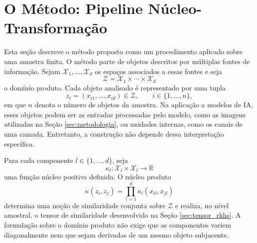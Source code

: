 \section{O Método: Pipeline Núcleo-Transformação}
\label{sec:kernel_pipeline}

Esta seção descreve o método proposto como um procedimento aplicado sobre uma amostra finita. O método parte de objetos descritos por múltiplas fontes de informação. Sejam $\mathcal{X}_1,\dots,\mathcal{X}_d$ os espaços associados a essas fontes e seja
\begin{equation}\label{eq:pipeline_product_domain}
    \mathcal{Z} = \mathcal{X}_1 \times \cdots \times \mathcal{X}_d
\end{equation}
o domínio produto. Cada objeto analisado é representado por uma tupla
\begin{equation}\label{eq:pipeline_observation}
    z_i = (x_{i1},\dots,x_{id}) \in \mathcal{Z}, \qquad i\in\{1,\dots,n\},
\end{equation}
em que $n$ denota o número de objetos da amostra. Na aplicação a modelos de IA, esses objetos podem ser as entradas processadas pelo modelo, como as imagens utilizadas na Seção \ref{sec:metodologia}, ou unidades internas, como os canais de uma camada. Entretanto, a construção não depende dessa interpretação específica.

Para cada componente $l\in\{1,\dots,d\}$, seja
\begin{equation*}
    \kappa_l:
    \mathcal{X}_l\times\mathcal{X}_l
    \longrightarrow
    \mathbb{R}
\end{equation*}
uma função núcleo positiva definida. O núcleo produto
\begin{equation}\label{eq:pipeline_product_kernel}
    \kappa(z_i,z_j) = \prod_{l=1}^{d} \kappa_l(x_{il},x_{jl})
\end{equation}
determina uma noção de similaridade conjunta sobre $\mathcal{Z}$ e realiza, no nível amostral, o tensor de similaridade desenvolvido na Seção \ref{sec:tensor_rkhs}. A formulação sobre o domínio produto não exige que as componentes variem diagonalmente nem que sejam derivadas de um mesmo objeto subjacente.

